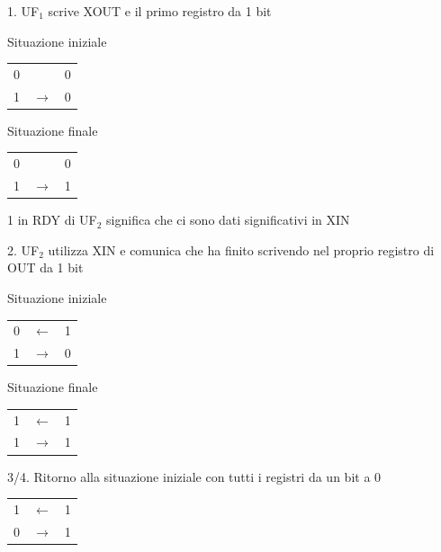 \documentclass[10pt]{report}
\begin{document}
\begin{list}{}{}
	\item 1. UF$_1$ scrive XOUT e il primo registro da 1 bit
	\begin{multicols}{2}
		\begin{center}
		Situazione iniziale\\
		\begin{tabular}{ c c c }
			 0 &   & 0 \\ 
			 1 & $\longrightarrow$ & 0
		\end{tabular}
		\end{center}
		\columnbreak
		\begin{center}
		Situazione finale\\
		\begin{tabular}{ c c c }
			 0 &   & 0 \\ 
			 1 & $\longrightarrow$ & 1
		\end{tabular}
		\end{center}
		1 in RDY di UF$_2$ significa che ci sono dati significativi in XIN
	\end{multicols}
	\item 2. UF$_2$ utilizza XIN e comunica che ha finito scrivendo nel proprio registro di OUT da 1 bit
	\begin{multicols}{2}
		\begin{center}
		Situazione iniziale\\
		\begin{tabular}{ c c c }
			 0 & $\longleftarrow$ & 1 \\ 
			 1 & $\longrightarrow$ & 0
		\end{tabular}
		\end{center}
		\columnbreak
		\begin{center}
		Situazione finale\\
		\begin{tabular}{ c c c }
			 1 & $\longleftarrow$ & 1 \\ 
			 1 & $\longrightarrow$ & 1
		\end{tabular}
		\end{center}
	\end{multicols}
	\item 3/4. Ritorno alla situazione iniziale con tutti i registri da un bit a 0
	\begin{multicols}{4}
		\begin{center}
		\begin{tabular}{ c c c }
			 1 & $\longleftarrow$ & 1 \\ 
			 0 & $\longrightarrow$ & 1

\end{tabular}
\end{center}
\end{multicols}
\end{list}
\end{document}
